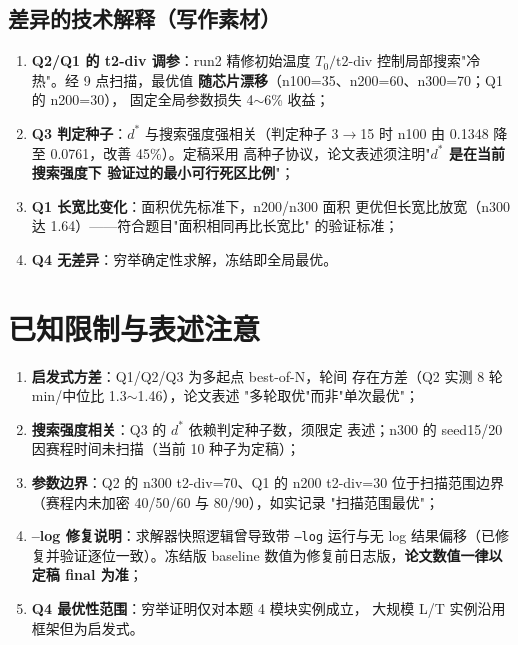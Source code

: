 \documentclass[12pt,a4paper]{article}
\begin{document}
\subsection{差异的技术解释（写作素材）}

\begin{enumerate}
    \item \textbf{Q2/Q1 的 t2-div 调参}：run2 精修初始温度
    $T_0/\text{t2-div}$ 控制局部搜索"冷热"。经 9 点扫描，最优值
    \textbf{随芯片漂移}（n100=35、n200=60、n300=70；Q1 的 n200=30），
    固定全局参数损失 4$\sim$6\% 收益；
    \item \textbf{Q3 判定种子}：$d^*$ 与搜索强度强相关（判定种子
    3$\to$15 时 n100 由 0.1348 降至 0.0761，改善 45\%）。定稿采用
    高种子协议，论文表述须注明"\textbf{$d^*$ 是在当前搜索强度下
    验证过的最小可行死区比例}"；
    \item \textbf{Q1 长宽比变化}：面积优先标准下，n200/n300 面积
    更优但长宽比放宽（n300 达 1.64）——符合题目"面积相同再比长宽比"
    的验证标准；
    \item \textbf{Q4 无差异}：穷举确定性求解，冻结即全局最优。
\end{enumerate}

\section{已知限制与表述注意}
\label{sec:limits}

\begin{enumerate}
    \item \textbf{启发式方差}：Q1/Q2/Q3 为多起点 best-of-N，轮间
    存在方差（Q2 实测 8 轮 min/中位比 1.3$\sim$1.46），论文表述
    "多轮取优"而非"单次最优"；
    \item \textbf{搜索强度相关}：Q3 的 $d^*$ 依赖判定种子数，须限定
    表述；n300 的 seed15/20 因赛程时间未扫描（当前 10 种子为定稿）；
    \item \textbf{参数边界}：Q2 的 n300 t2-div=70、Q1 的 n200 t2-div=30
    位于扫描范围边界（赛程内未加密 40/50/60 与 80/90），如实记录
    "扫描范围最优"；
    \item \textbf{--log 修复说明}：求解器快照逻辑曾导致带 \texttt{--log}
    运行与无 log 结果偏移（已修复并验证逐位一致）。冻结版 baseline
    数值为修复前日志版，\textbf{论文数值一律以定稿 final 为准}；
    \item \textbf{Q4 最优性范围}：穷举证明仅对本题 4 模块实例成立，
    大规模 L/T 实例沿用框架但为启发式。
\end{enumerate}
\end{document}
